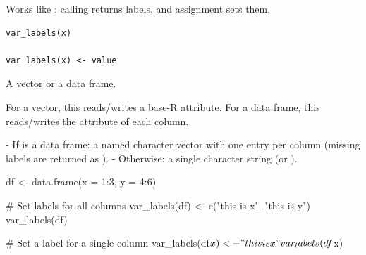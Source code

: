 \documentclass[a4paper]{book}
\begin{document}
%
\begin{Description}
Works like : calling  returns labels, and
assignment  sets them.
\end{Description}
%
\begin{Usage}
\begin{verbatim}
var_labels(x)

var_labels(x) <- value
\end{verbatim}
\end{Usage}
%
\begin{Arguments}
\begin{ldescription}
\item[\code{x}] A vector or a data frame.
\end{ldescription}
\end{Arguments}
%
\begin{Details}
For a vector, this reads/writes a base-R  attribute.
For a data frame, this reads/writes the  attribute of each
column.
\end{Details}
%
\begin{Value}
- If  is a data frame: a named character vector with one entry per
column (missing labels are returned as ).
- Otherwise: a single character string (or ).
\end{Value}
%
\begin{Examples}
\begin{ExampleCode}
df <- data.frame(x = 1:3, y = 4:6)

# Set labels for all columns
var_labels(df) <- c("this is x", "this is y")
var_labels(df)

# Set a label for a single column
var_labels(df$x) <- "this is x"
var_labels(df$x)

\end{ExampleCode}
\end{Examples}
\printindex{}
\end{document}
